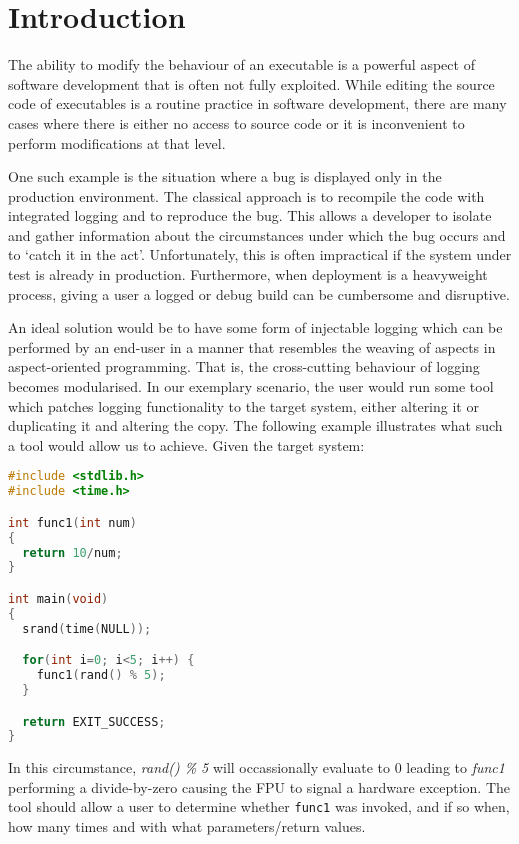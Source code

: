 \chapter{Introduction}

The ability to modify the behaviour of an executable is a powerful aspect of software development that is often not fully exploited. While editing the source code of executables is a routine practice in software development, there are many cases where there is either no access to source code or it is inconvenient to perform modifications at that level.

One such example is the situation where a bug is displayed only in the production environment. The classical approach is to recompile the code with integrated logging and to reproduce the bug. This allows a developer to isolate and gather information about the circumstances under which the bug occurs and to `catch it in the act'. Unfortunately, this is often impractical if the system under test is already in production. Furthermore, when deployment is a heavyweight process, giving a user a logged or debug build can be cumbersome and disruptive.

An ideal solution would be to have some form of injectable logging which can be performed by an end-user in a manner that resembles the weaving of aspects in aspect-oriented programming. That is, the cross-cutting behaviour of logging becomes modularised. In our exemplary scenario, the user would run some tool which patches logging functionality to the target system, either altering it or duplicating it and altering the copy. The following example illustrates what such a tool would allow us to achieve. Given the target system:

\begin{lstlisting}[language=C,caption={Target Process}]
#include <stdlib.h>
#include <time.h>

int func1(int num)
{
  return 10/num;
}

int main(void)
{
  srand(time(NULL));

  for(int i=0; i<5; i++) {
    func1(rand() % 5);
  }

  return EXIT_SUCCESS;
}
\end{lstlisting}

In this circumstance, \emph{rand() \% 5} will occassionally evaluate to 0 leading to \emph{func1} performing a divide-by-zero causing the FPU to signal a hardware exception. The tool should allow a user to determine whether \texttt{func1} was invoked, and if so when, how many times and with what parameters/return values.

